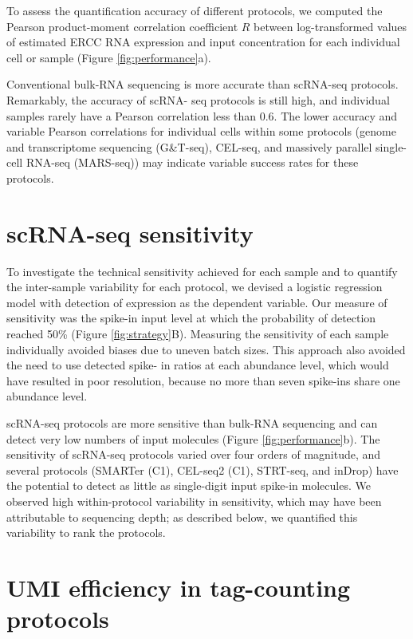 To assess the quantification accuracy of different protocols, we computed the Pearson product-moment correlation coefficient \( R \) between log-transformed values of estimated ERCC RNA expression and input concentration for each individual cell or sample (Figure \ref{fig:performance}a).

Conventional bulk-RNA sequencing is more accurate than scRNA-seq protocols. Remarkably, the accuracy of scRNA- seq protocols is still high, and individual samples rarely have a Pearson correlation less than 0.6. The lower accuracy and variable Pearson correlations for individual cells within some protocols (genome and transcriptome sequencing (G\&T-seq), CEL-seq, and massively parallel single-cell RNA-seq (MARS-seq)) may indicate variable success rates for these protocols.

\section{scRNA-seq sensitivity}

To investigate the technical sensitivity achieved for each sample and to quantify the inter-sample variability for each protocol, we devised a logistic regression model with detection of expression as the dependent variable. Our measure of sensitivity was the spike-in input level at which the probability of detection reached 50\% (Figure \ref{fig:strategy}B). Measuring the sensitivity of each sample individually avoided biases due to uneven batch sizes. This approach also avoided the need to use detected spike- in ratios at each abundance level, which would have resulted in poor resolution, because no more than seven spike-ins share one abundance level.

scRNA-seq protocols are more sensitive than bulk-RNA sequencing and can detect very low numbers of input molecules (Figure \ref{fig:performance}b). The sensitivity of scRNA-seq protocols varied over four orders of magnitude, and several protocols (SMARTer (C1), CEL-seq2 (C1), STRT-seq, and inDrop) have the potential to detect as little as single-digit input spike-in molecules. We observed high within-protocol variability in sensitivity, which may have been attributable to sequencing depth; as described below, we quantified this variability to rank the protocols.

\section{UMI efficiency in tag-counting protocols}

